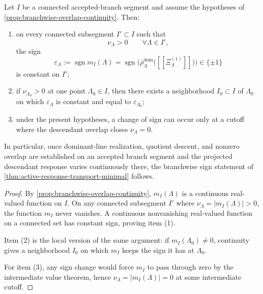 \documentclass[11pt]{article}
\begin{document}
\begin{theorem}
\label{thm:branchwise-orientation-transport}
Let \(I\) be a connected accepted-branch segment and assume the hypotheses of
\cref{prop:branchwise-overlap-continuity}.
Then:
\begin{enumerate}[leftmargin=2em]
\item on every connected subsegment \(I'\subset I\) such that
  \[
  \nu_{\Lambda}>0
  \qquad
  \forall \Lambda\in I',
  \]
  the sign
  \begin{equation}
  \varepsilon_{\Lambda}
  :=
  \operatorname{sgn} m_I(\Lambda)
  =
  \operatorname{sgn}\!\Big(
  \overline{\rho}^{\mathrm{dom}}_{\Lambda}\big([\![\Xi^{(1)}_{\Lambda}]\!]\big)
  \Big)
  \in\{\pm1\}
  \label{eq:branchwise-epsilon}
  \end{equation}
  is constant on \(I'\);
\item if \(\nu_{\Lambda_0}>0\) at one point \(\Lambda_0\in I\), then there exists a neighborhood
  \(I_0\subset I\) of \(\Lambda_0\) on which \(\varepsilon_{\Lambda}\) is constant and equal to
  \(\varepsilon_{\Lambda_0}\);
\item under the present hypotheses, a change of sign can occur only at a cutoff where the
  descendant overlap closes
  \(
  \nu_{\Lambda}=0
  \).
\end{enumerate}
In particular, once dominant-line realization, quotient descent, and nonzero overlap are
established on an accepted branch segment and the projected descendant response varies continuously
there, the branchwise sign statement of \cref{thm:active-response-transport-minimal} follows.
\end{theorem}

\begin{proof}
By \cref{prop:branchwise-overlap-continuity}, \(m_I(\Lambda)\) is a continuous real-valued function
on \(I\).
On any connected subsegment \(I'\) where \(\nu_{\Lambda}=|m_I(\Lambda)|>0\), the function \(m_I\)
never vanishes.
A continuous nonvanishing real-valued function on a connected set has constant sign, proving item
(1).

Item (2) is the local version of the same argument: if \(m_I(\Lambda_0)\neq 0\), continuity gives a
neighborhood \(I_0\) on which \(m_I\) keeps the sign it has at \(\Lambda_0\).

For item (3), any sign change would force \(m_I\) to pass through zero by the intermediate value
theorem, hence \(\nu_{\Lambda}=|m_I(\Lambda)|=0\) at some intermediate cutoff.
\end{proof}
\end{document}

